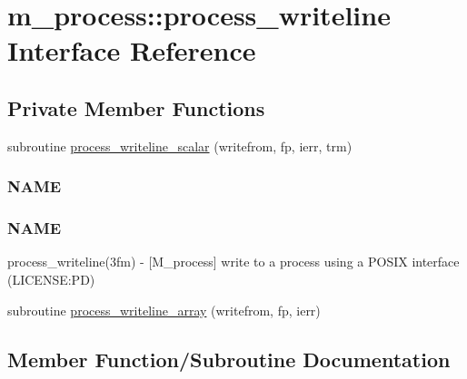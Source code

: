 \hypertarget{interfacem__process_1_1process__writeline}{}\section{m\+\_\+process\+:\+:process\+\_\+writeline Interface Reference}
\label{interfacem__process_1_1process__writeline}
\subsection*{Private Member Functions}
\begin{DoxyCompactItemize}
\item 
subroutine \mbox{\hyperlink{interfacem__process_1_1process__writeline_a9e95166556bec54fd10568f01d02f34e}{process\+\_\+writeline\+\_\+scalar}} (writefrom, fp, ierr, trm)
\begin{DoxyCompactList}\small\item\em \subsubsection*{N\+A\+ME}

\subsubsection*{N\+A\+ME}

process\+\_\+writeline(3fm) -\/ \mbox{[}M\+\_\+process\mbox{]} write to a process using a P\+O\+S\+IX interface (L\+I\+C\+E\+N\+SE\+:PD) \end{DoxyCompactList}\item 
subroutine \mbox{\hyperlink{interfacem__process_1_1process__writeline_aa3543e9b23056b2f35869003f777f65d}{process\+\_\+writeline\+\_\+array}} (writefrom, fp, ierr)
\end{DoxyCompactItemize}


\subsection{Member Function/\+Subroutine Documentation}
\mbox{\label{interfacem__process_1_1process__writeline_aa3543e9b23056b2f35869003f777f65d}} 
